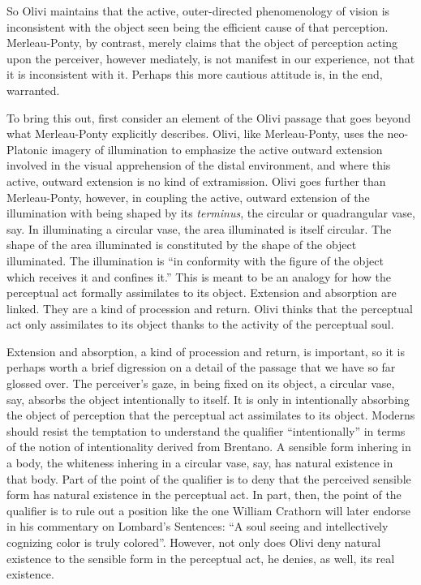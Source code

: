 \documentclass[12pt]{article}
\begin{document}
So Olivi maintains that the active, outer-directed phenomenology of vision is inconsistent with the object seen being the efficient cause of that perception. Merleau-Ponty, by contrast, merely claims that the object of perception acting upon the perceiver, however mediately, is not manifest in our experience, not that it is inconsistent with it. Perhaps this more cautious attitude is, in the end, warranted.

To bring this out, first consider an element of the Olivi passage that goes beyond what Merleau-Ponty explicitly describes. Olivi, like Merleau-Ponty, uses the neo-Platonic imagery of illumination to emphasize the active outward extension involved in the visual apprehension of the distal environment, and where this active, outward extension is no kind of extramission. Olivi goes further than Merleau-Ponty, however, in coupling the active, outward extension of the illumination with being shaped by its \emph{terminus}, the circular or quadrangular vase, say. In illuminating a circular vase, the area illuminated is itself circular. The shape of the area illuminated is constituted by the shape of the object illuminated. The illumination is ``in conformity with the figure of the object which receives it and confines it.'' This is meant to be an analogy for how the perceptual act formally assimilates to its object. Extension and absorption are linked. They are a kind of procession and return. Olivi thinks that the perceptual act only assimilates to its object thanks to the activity of the perceptual soul.

Extension and absorption, a kind of procession and return, is important, so it is perhaps worth a brief digression on a detail of the passage that we have so far glossed over. The perceiver's gaze, in being fixed on its object, a circular vase, say, absorbs the object intentionally to itself. It is only in intentionally absorbing the object of perception that the perceptual act assimilates to its object. Moderns should resist the temptation to understand the qualifier ``intentionally'' in terms of the notion of intentionality derived from Brentano. A sensible form inhering in a body, the whiteness inhering in a circular vase, say, has natural existence in that body. Part of the point of the qualifier is to deny that the perceived sensible form has natural existence in the perceptual act. In part, then, the point of the qualifier is to rule out a position like the one William Crathorn will later endorse in his commentary on Lombard’s Sentences: ``A soul seeing and intellectively cognizing color is truly colored''. However, not only does Olivi deny natural existence to the sensible form in the perceptual act, he denies, as well, its real existence. 
\end{document}
